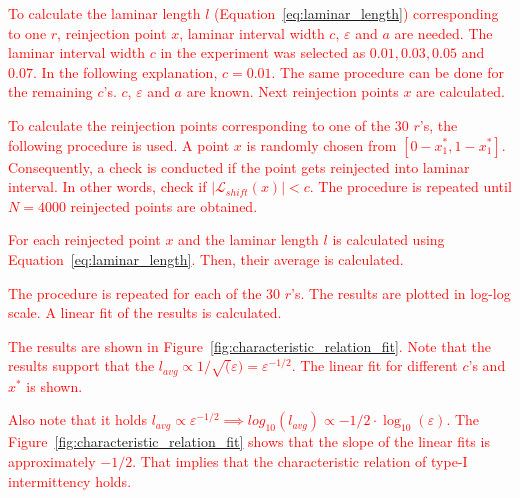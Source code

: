 \par
\textcolor{red}{
To calculate the laminar length $l$ (Equation~\eqref{eq:laminar_length}) corresponding to one $r$, reinjection point $x$, laminar interval width $c$, $\varepsilon$ and $a$ are needed.
The laminar interval width $c$ in the experiment was selected as $0.01, 0.03, 0.05$ and $0.07$.
In the following explanation, $c = 0.01$.
The same procedure can be done for the remaining $c$'s.
$c$, $\varepsilon$ and $a$ are known.
Next reinjection points $x$ are calculated.
}
\par
\textcolor{red}{
To calculate the reinjection points corresponding to one of the $30$ $r$'s, the following procedure is used.
A point $x$ is randomly chosen from $[ 0-x^{*}_{1}, 1-x^{*}_{1} ]$.
Consequently, a check is conducted if the point gets reinjected into laminar interval.
In other words, check if $| \mathcal{L}_{shift}(x) | < c$.
The procedure is repeated until $N = 4000$ reinjected points are obtained.
}
\par
\textcolor{red}{
For each reinjected point $x$ and the laminar length $l$ is calculated using Equation~\eqref{eq:laminar_length}.
Then, their average is calculated.
}
\par
\textcolor{red}{
The procedure is repeated for each of the $30$ $r$'s.
The results are plotted in log-log scale.
A linear fit of the results is calculated.
}
\par
\textcolor{red}{
The results are shown in Figure~\ref{fig:characteristic_relation_fit}.
Note that the results support that the $l_{avg} \propto 1/\sqrt(\varepsilon) = \varepsilon ^ {-1/2}$.
The linear fit for different $c$'s and $x^{*}$ is shown.
}
\par
\textcolor{red}{
Also note that it holds $l_{avg} \propto \varepsilon ^ {-1/2} \implies log_{10}(l_{avg}) \propto -1/2 \cdot \log_{10}(\varepsilon)$.
The Figure~\ref{fig:characteristic_relation_fit} shows that the slope of the linear fits is approximately $-1/2$.
That implies that the characteristic relation of type-I intermittency holds. 
}

